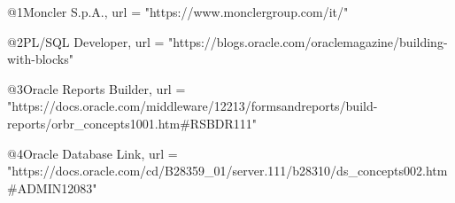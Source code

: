 @1{Moncler S.p.A.,
url = "https://www.monclergroup.com/it/"}

@2{PL/SQL Developer,
url = "https://blogs.oracle.com/oraclemagazine/building-with-blocks"}

@3{Oracle Reports Builder,
url = "https://docs.oracle.com/middleware/12213/formsandreports/build-reports/orbr_concepts1001.htm#RSBDR111"}

@4{Oracle Database Link,
url = "https://docs.oracle.com/cd/B28359\_01/server.111/b28310/ds\_concepts002.htm\#ADMIN12083"}


